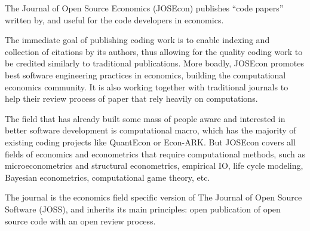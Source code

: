 
The Journal of Open Source Economics (JOSEcon) publishes ``code papers'' written by, 
and useful for the code developers in economics. 

The immediate goal of publishing coding work is to enable indexing and collection of citations by
its authors, thus allowing for the quality coding work to be credited similarly to traditional 
publications.
More boadly, JOSEcon promotes best software engineering practices in economics, 
building the computational economics community. 
It is also working together with traditional journals to help their review process 
of paper that rely heavily on computations.  

The field that has already built some mass of people aware and interested in better software development is computational macro, which has the majority of existing coding projects like QuantEcon or Econ-ARK.
But JOSEcon covers all fields of economics and econometrics that require computational methods,
such as microeconometrics and structural econometrics, empirical IO, life cycle modeling, Bayesian econometrics, computational game theory, etc. 

The journal is the economics field specific version of The Journal of Open Source Software (JOSS), 
and inherits its main principles: open publication of open source code with an open review process.

